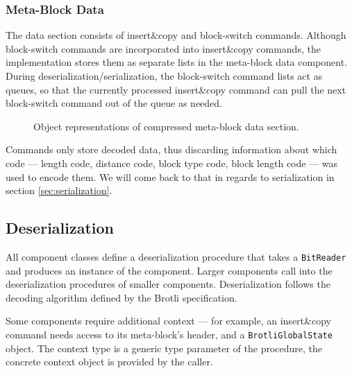 \documentclass[english,master,dept460,male,cpp,cpdeclaration]{diploma}
\newcommand{\texfigure}[1]{
}
\begin{document}
		\subsubsection{Meta-Block Data}
		
		The data section consists of insert\&copy and block-switch commands. Although block-switch commands are incorporated into insert\&copy commands, the implementation stores them as separate lists in the meta-block data component. During deserialization/serialization, the block-switch command lists act as queues, so that the currently processed insert\&copy command can pull the next block-switch command out of the queue as needed.
		
		\begin{figure}[H]
			\centering
			\medskip
			\texfigure{object-representation-meta-block-data}
			\caption{Object representations of compressed meta-block data section.}
			\label{fig:bfs-compressed-data}
		\end{figure}
		
		\noindent
		Commands only store decoded data, thus discarding information about which code --- length code, distance code, block type code, block length code --- was used to encode them. We will come back to that in regards to serialization in section \ref{sec:serialization}.
	
	\subsection{Deserialization}
	
	\addtocounter{footnote}{-2}
	
	All component classes define a deserialization procedure that takes a \verb|BitReader| and produces an instance of the component. Larger components call into the deserialization procedures of smaller components. Deserialization follows the decoding algorithm defined by the Brotli specification\cite{RFC7932}.
	
	Some components require additional context --- for example, an insert\&copy command needs access to its meta-block's header, and a \verb|BrotliGlobalState| object. The context type is a generic type parameter of the procedure, the concrete context object is provided by the caller.
	
\end{document}
